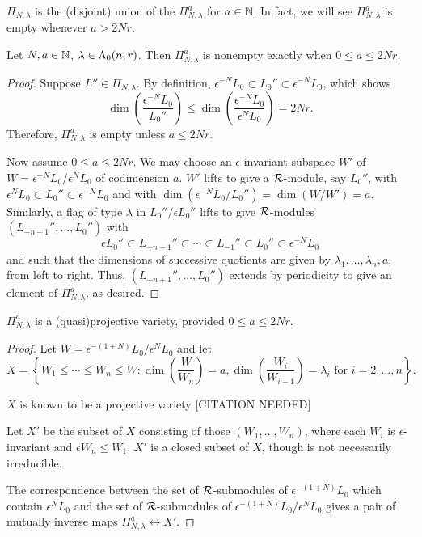 \documentclass[a4paper, 11pt]{report}
\begin{document}
$\Pi_{N,\lambda}$ is the (disjoint) union of the $\Pi_{N,\lambda}^a$ for $a\in\mathbb{N}$. In fact, we will see $\Pi_{N,\lambda}^a$ is empty whenever $a > 2Nr$.

\begin{lemma}
Let $N,a\in\mathbb{N}$, $\lambda\in\Lambda_0(n,r)$. Then $\Pi_{N,\lambda}
^a$ is nonempty exactly when $0\le a \le 2Nr$.
\end{lemma}

\begin{proof}
Suppose $L''\in\Pi_{N,\lambda}$. By definition, $\epsilon^{-N}L_0\subset L_0''\subset \epsilon^{-N}L_0$, which shows
\begin{equation*}
\dim\left(\frac{\epsilon^{-N}L_0}{L_0''}\right) \le \dim\left(\frac{\epsilon^{-N}L_0}{\epsilon^N L_0}\right) = 2Nr.
\end{equation*}
Therefore, $\Pi_{N,\lambda}^a$ is empty unless $a\le 2Nr$.

Now assume $0\le a\le 2Nr$. We may choose an $\epsilon$-invariant subspace $W'$ of $W = \epsilon^{-N}L_0/{\epsilon^N L_0}$ of codimension $a$. $W'$ lifts to give a $\mathcal{R}$-module, say $L_0''$, with $\epsilon^N L_0\subset L_0''\subset \epsilon^{-N}L_0$ and with $\dim(\epsilon^{-N}L_0/{L_0''}) = \dim(W/W') = a$. Similarly, a flag of type $\lambda$ in $L_0''/{\epsilon L_0''}$ lifts to give $\mathcal{R}$-modules $(L_{-n+1}'',\ldots,L_0'')$ with
\begin{equation*}
\epsilon L_0''\subset L_{-n+1}''\subset\cdots\subset L_{-1}''\subset L_0''\subset \epsilon^{-N}L_0
\end{equation*}
and such that the dimensions of successive quotients are given by $\lambda_1,\ldots,\lambda_n,a$, from left to right. Thus, $(L_{-n+1}'',\ldots,L_0'')$ extends by periodicity to give an element of $\Pi_{N,\lambda}^a$, as desired.
\end{proof}

\begin{lemma}
$\Pi_{N,\lambda}^a$ is a (quasi)projective variety, provided $0\le a\le 2Nr$.
\end{lemma}
\begin{proof}
Let $W= \epsilon^{-(1+N)}L_0/{\epsilon^N L_0}$ and let
\begin{equation*}
X = \left\{W_1\le\cdots\le W_n\le W:\dim\left(\frac{W}{W_n}\right)=a, \dim\left(\frac{W_i}{W_{i-1}}\right) = \lambda_i \text{ for } i=2,\ldots,n\right\}.
\end{equation*}

$X$ is known to be a projective variety {\color{red}[CITATION NEEDED]}

Let $X'$ be the subset of $X$ consisting of those $(W_1,\ldots, W_n)$, where each $W_i$ is $\epsilon$-invariant and $\epsilon W_n \le W_1$. $X'$ is a closed subset of $X$, though is not necessarily irreducible.

The correspondence between the set of $\mathcal{R}$-submodules of $\epsilon^{-(1+N)}L_0$ which contain $\epsilon^N L_0$ and the set of $\mathcal{R}$-submodules of $\epsilon^{-(1+N)}L_0/{\epsilon^N L_0}$ gives a pair of mutually inverse maps $\Pi_{N,\lambda}^a\leftrightarrow X'$.
\end{proof}
\end{document}
